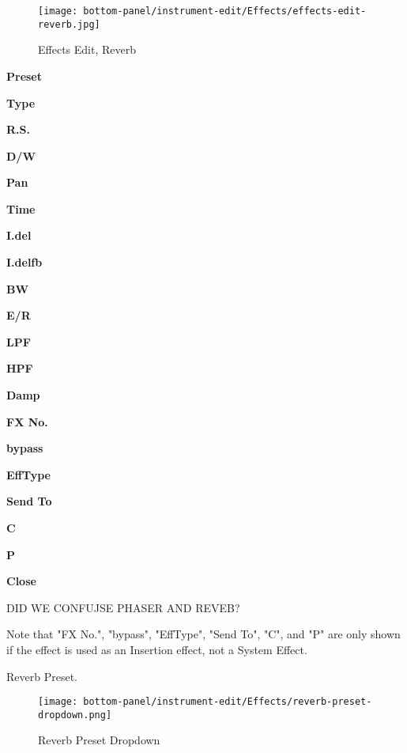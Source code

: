 \begin{figure}[H]
   \centering 
   \texttt{[image: bottom-panel/instrument-edit/Effects/effects-edit-reverb.jpg]}
   \caption{Effects Edit, Reverb}
   \label{fig:effects_edit_reverb}
\end{figure}

   \begin{enumber}
      \item \textbf{Preset}
      \item \textbf{Type}
      \item \textbf{R.S.}
      \item \textbf{D/W}
      \item \textbf{Pan}
      \item \textbf{Time}
      \item \textbf{I.del}
      \item \textbf{I.delfb}
      \item \textbf{BW}
      \item \textbf{E/R}
      \item \textbf{LPF}
      \item \textbf{HPF}
      \item \textbf{Damp}
      \item \textbf{FX No.}
      \item \textbf{bypass}
      \item \textbf{EffType}
      \item \textbf{Send To}
      \item \textbf{C}
      \item \textbf{P}
      \item \textbf{Close}
   \end{enumber}

   DID WE CONFUJSE PHASER AND REVEB?

   Note that "FX No.", "bypass", "EffType", "Send To", "C", and "P" are only
   shown if the effect is used as an Insertion effect, not a System Effect.

   \setcounter{ItemCounter}{0}      %

      Reverb Preset.

\begin{figure}[H]
   \centering 
   \texttt{[image: bottom-panel/instrument-edit/Effects/reverb-preset-dropdown.png]}
   \caption{Reverb Preset Dropdown}
   \label{fig:reverb_preset_dropdown}
\end{figure}

